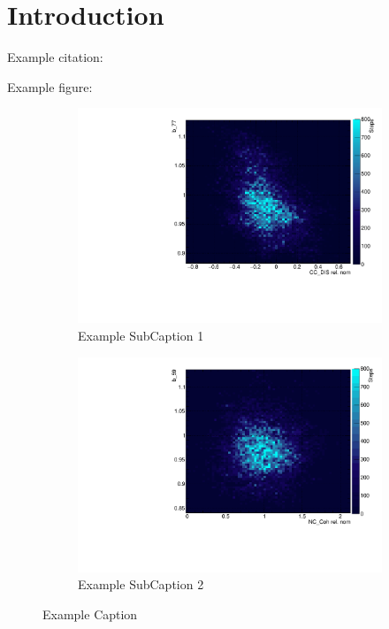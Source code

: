 \chapter{Introduction}
\label{chap:Introduction}

Example citation: \cite{metropolis}

Example figure:
\begin{figure}[h]
  \begin{subfigure}[t]{0.40\textwidth}
    \includegraphics[width=\textwidth, trim={0mm 0mm 0mm 0mm}, clip,page=1]{Figures/Introduction/Example}
    \caption{Example SubCaption 1}
  \end{subfigure}
  \begin{subfigure}[t]{0.40\textwidth}
    \includegraphics[width=\textwidth, trim={0mm 0mm 0mm 0mm}, clip,page=1]{Figures/Introduction/Example2}
    \caption{Example SubCaption 2}
  \end{subfigure}
  \caption{Example Caption}
  \label{fig:ExampleFigure}
\end{figure}
